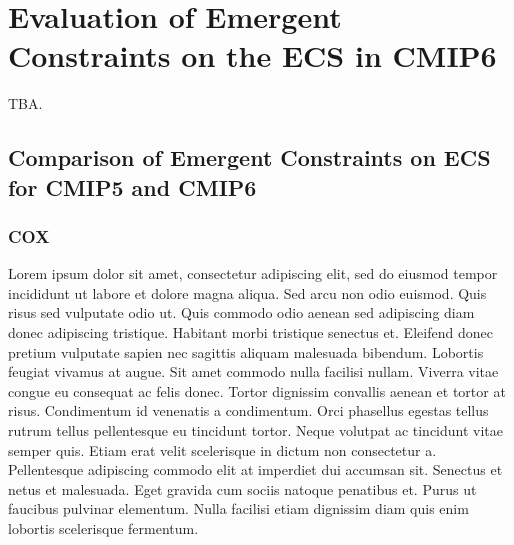 


\chapter{Evaluation of Emergent Constraints on the \acl{ECS} in \acs{CMIP}6}
\label{ch:05:paper_ecs}

TBA.


\section{Comparison of Emergent Constraints on \acs{ECS} for \acs{CMIP}5 and
  \acs{CMIP}6}
\label{sec:05:comparison_of_emergent_constraints}


\subsection{COX}
\label{subsec:05:cox}

Lorem ipsum dolor sit amet, consectetur adipiscing elit, sed do eiusmod tempor
incididunt ut labore et dolore magna aliqua. Sed arcu non odio euismod. Quis
risus sed vulputate odio ut. Quis commodo odio aenean sed adipiscing diam donec
adipiscing tristique. Habitant morbi tristique senectus et. Eleifend donec
pretium vulputate sapien nec sagittis aliquam malesuada bibendum. Lobortis
feugiat vivamus at augue. Sit amet commodo nulla facilisi nullam. Viverra vitae
congue eu consequat ac felis donec. Tortor dignissim convallis aenean et tortor
at risus. Condimentum id venenatis a condimentum. Orci phasellus egestas tellus
rutrum tellus pellentesque eu tincidunt tortor. Neque volutpat ac tincidunt
vitae semper quis. Etiam erat velit scelerisque in dictum non consectetur a.
Pellentesque adipiscing commodo elit at imperdiet dui accumsan sit. Senectus et
netus et malesuada. Eget gravida cum sociis natoque penatibus et. Purus ut
faucibus pulvinar elementum. Nulla facilisi etiam dignissim diam quis enim
lobortis scelerisque fermentum.

